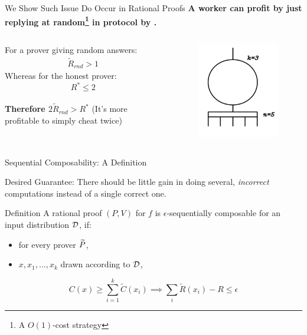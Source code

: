 \begin{frame}[t]{We Show Such Issue Do Occur in Rational Proofs}
\large{\textbf{A worker can profit by just replying at random\footnote{A $O(1)$-cost strategy} in protocol by \cite{am1}.}}
\medskip
\begin{columns}
	For a prover giving random answers:
	\onslide<2->
	\begin{align*}
	\tilde{R}_{rnd} > 1
	\end{align*}
	\onslide<3->
	Whereas for the honest prover:
	\[
	R^* \leq 2
	\]\\
	\medskip
	\onslide<4->
\textbf{	Therefore $2\tilde{R}_{rnd} > R^*$}
{(It's more profitable to simply cheat twice)}
	\onslide<1->
	\begin{figure}
		\includegraphics[scale=0.7]{pics/threshold-circ.png}
		
	\end{figure}
\end{columns}

\end{frame}

\begin{frame}{Sequential Composability: A Definition}

\begin{framed}
\begin{block}{Desired Guarantee:}
	There should be little gain in doing several, \textit{incorrect} computations instead of a single correct one.
\end{block}
\end{framed}
	\bigskip
\pause
	\begin{block}{Definition}
		A rational proof $(P,V)$ for $f$ 
		is $\epsilon$-{\sf sequentially composable} for an input distribution $\cal D$, if:
			\pause
		\begin{itemize}
			\item  for every prover $\widetilde{P}$, 
				\pause
			\item	$x,x_1,\ldots,x_k$ drawn according to ${\cal D}$,
		\end{itemize}
				\pause
		$$C(x) \geq \sum_{i=1}^k 
		\tilde{C}(x_i)\implies \sum_{i}\tilde{R}(x_i) - R \leq \epsilon$$
	\end{block}
\end{frame}

